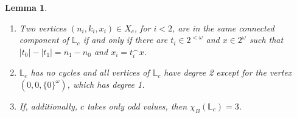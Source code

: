 \documentclass[11pt]{article}
\theoremstyle{plain}
\newtheorem{lemma}[theorem]{Lemma}
\theoremstyle{definition}
\theoremstyle{remark}
\begin{document}
\begin{lemma}\label{lemma:L0_basics}~ 
    \begin{enumerate}[label=(\alph*)]
        \item Two vertices $(n_i,k_i,x_i)\in X_c$, for $i<2$, are in the same connected component of $\mathbb L_c$ if and only if there are $t_i\in2^{<\omega}$ and $x\in2^\omega$ such that $|t_0|-|t_1|=n_1-n_0$ and $x_i=t_i^\smallfrown x$.
        
        \item $\mathbb L_c$ has no cycles and all vertices of $\mathbb L_c$ have degree 2 except for the vertex $(0,0,\{0\}^\omega)$, which has degree 1.
        
        \item If, additionally, $c$ takes only odd values, then $\chi_B(\mathbb L_c)=3$.
    \end{enumerate}
\end{lemma}
\end{document}
